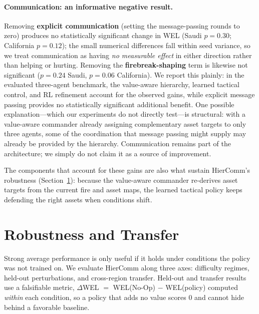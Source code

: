 \documentclass[letterpaper]{article}
\begin{document}
\paragraph{Communication: an informative negative result.}
Removing \textbf{explicit communication} (setting the message-passing rounds to zero) produces no statistically significant change in WEL (Saudi $p=0.30$; California $p=0.12$); the small numerical differences fall within seed variance, so we treat communication as having \emph{no measurable effect} in either direction rather than helping or hurting. Removing the \textbf{firebreak-shaping} term is likewise not significant ($p=0.24$ Saudi, $p=0.06$ California). We report this plainly: in the evaluated three-agent benchmark, the value-aware hierarchy, learned tactical control, and RL refinement account for the observed gains, while explicit message passing provides no statistically significant additional benefit. One possible explanation---which our experiments do not directly test---is structural: with a value-aware commander already assigning complementary asset targets to only three agents, some of the coordination that message passing might supply may already be provided by the hierarchy. Communication remains part of the architecture; we simply do not claim it as a source of improvement.

The components that account for these gains are also what sustain HierComm's robustness (Section~\ref{sec:transfer}): because the value-aware commander re-derives asset targets from the current fire and asset maps, the learned tactical policy keeps defending the right assets when conditions shift.

\section{Robustness and Transfer}
\label{sec:transfer}

Strong average performance is only useful if it holds under conditions the policy was not trained on. We evaluate HierComm along three axes: difficulty regimes, held-out perturbations, and cross-region transfer. Held-out and transfer results use a falsifiable metric, $\Delta$WEL $=$ WEL(No-Op) $-$ WEL(policy) computed \emph{within} each condition, so a policy that adds no value scores $0$ and cannot hide behind a favorable baseline.
\end{document}
